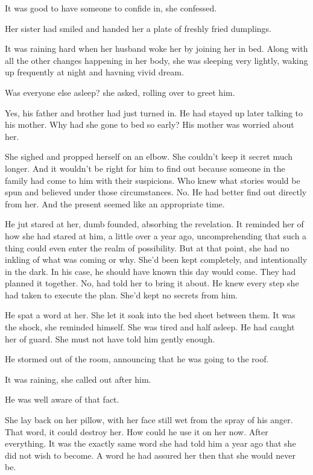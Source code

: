 \documentclass{article}
\begin{document}
It was good to have someone to confide in, she confessed. 

Her sister had smiled and handed her a plate of freshly fried dumplings.

It was raining hard when her husband woke her by joining her in bed. Along with all the other changes happening in her body, she was sleeping very lightly, waking up frequently at night and havning vivid dream.

Was everyone else asleep? she asked, rolling over to greet him.

Yes, his father and brother had just turned in. He had stayed up later talking to his mother. Why had she gone to bed so early? His mother was worried about her.

She sighed and propped herself on an elbow. She couldn't keep it secret much longer. And it wouldn't be right for him to find out because someone in the family had come to him with their suspicions. Who knew what stories would be spun and believed under those circumstances. No. He had better find out directly from her. And the present seemed like an appropriate time.

He jut stared at her, dumb founded, absorbing the revelation. It reminded her of how she had stared at him, a little over a year ago, uncomprehending that such a thing could even enter the realm of possibility. But at that point, she had no inkling of what was coming or why. She'd been kept completely, and intentionally in the dark. In his case, he should have known this day would come. They had planned it together. No, had told her to bring it about. He knew every step she had taken to execute the plan. She'd kept no secrets from him.  

He spat a word at her. She let it soak into the bed sheet between them. It was the shock, she reminded himself. She was tired and half asleep. He had caught her of guard. She must not have told him gently enough. 

He stormed out of the room, announcing that he was going to the roof. 

It was raining, she called out after him.

He was well aware of that fact.

She lay back on her pillow, with her face still wet from the spray of his anger. That word, it could destroy her. How could he use it on her now. After everything. It was the exactly same word she had told him a year ago that she did not wish to become. A word he had assured her then that she would never be.
\end{document}
